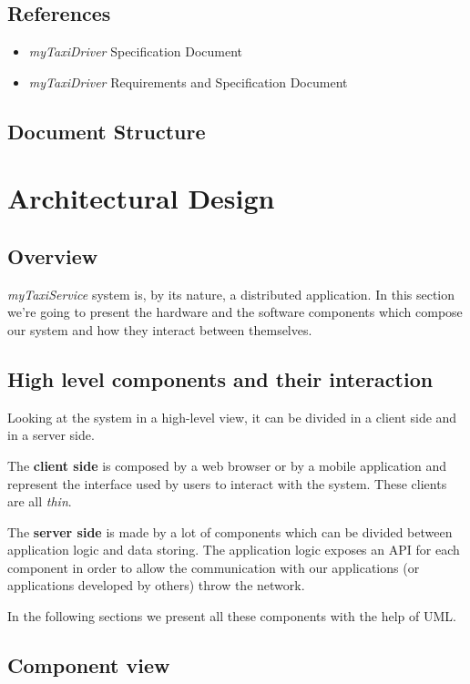 \documentclass[a4paper]{article}
\begin{document}
\subsection{References}
\begin{itemize}
\item \emph{myTaxiDriver} Specification Document
\item \emph{myTaxiDriver} Requirements and Specification Document
\end{itemize}

\subsection{Document Structure}

\section{Architectural Design}

\subsection{Overview}

\emph{myTaxiService} system is, by its nature, a distributed application.
In this section we're going to present the hardware and the software components which compose our system and how they interact between themselves.

\subsection{High level components and their interaction}

Looking at the system in a high-level view, it can be divided in a client side and in a server side.

The \textbf{client side} is composed by a web browser or by a mobile application and represent the interface used by users to interact with the system. These clients are all \emph{thin}.

The \textbf{server side} is made by a lot of components which can be divided between application logic and data storing. The application logic exposes an API for each component in order to allow the communication with our applications (or applications developed by others) throw the network.

In the following sections we present all these components with the help of UML.

\subsection{Component view}
\end{document}
